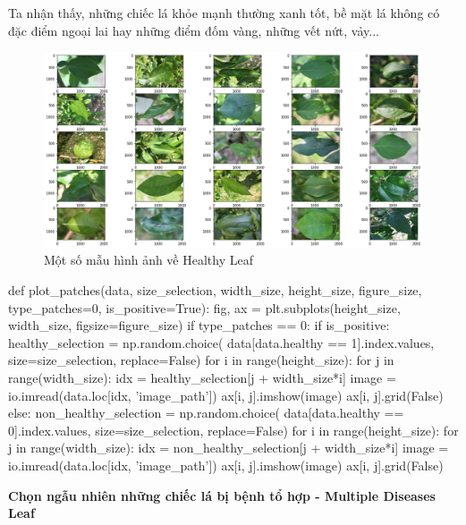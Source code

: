 \documentclass{article}
\begin{document}
	Ta nhận thấy, những chiếc lá khỏe mạnh thường xanh tốt, bề mặt lá không có đặc điểm ngoại lai hay những điểm đốm vàng, những vết nứt, vảy...
	\begin{figure}[H]
		\centering
		\includegraphics[width=1\linewidth]{images/sample_healthy_leaf.png}
		\caption{Một số mẫu hình ảnh về Healthy Leaf}
		\label{fig:writing-thesis}
	\end{figure}
	\begin{python}
		def plot_patches(data, size_selection, width_size, height_size, figure_size, type_patches=0, is_positive=True):
		fig, ax = plt.subplots(height_size, width_size, figsize=figure_size)
			if type_patches == 0:
				if is_positive:
					healthy_selection = np.random.choice(
					data[data.healthy == 1].index.values, size=size_selection, replace=False)
					for i in range(height_size):
						for j in range(width_size):
						idx = healthy_selection[j + width_size*i]
						image = io.imread(data.loc[idx, 'image_path'])
						ax[i, j].imshow(image)
					ax[i, j].grid(False)
				else:
					non_healthy_selection = np.random.choice(
					data[data.healthy == 0].index.values, size=size_selection, replace=False)
					for i in range(height_size):
						for j in range(width_size):
							idx = non_healthy_selection[j + width_size*i]
							image = io.imread(data.loc[idx, 'image_path'])
							ax[i, j].imshow(image)
							ax[i, j].grid(False)
	\end{python}
	\textbf{Chọn ngẫu nhiên những chiếc lá bị bệnh tổ hợp - Multiple Diseases Leaf}
	
\end{document}
